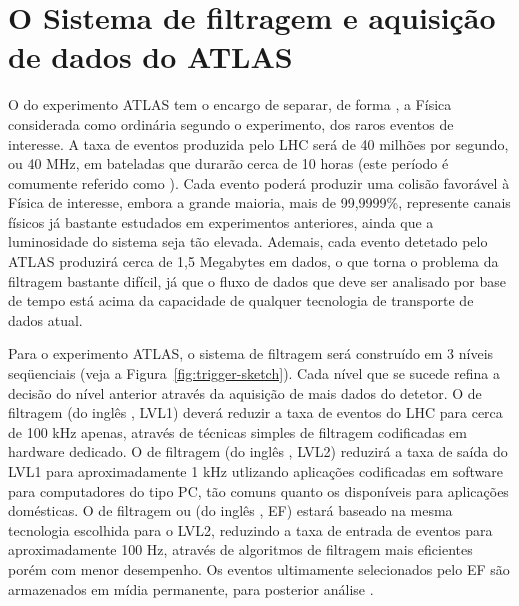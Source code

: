 \typeout{ ====================================================================}
\typeout{ ====================================================================}

\chapter{O Sistema de filtragem e aquisição de dados do ATLAS}
\label{chap:trigger}

O  do experimento ATLAS tem o encargo de separar, de
forma , a Física considerada como ordinária segundo o experimento,
dos raros eventos de interesse. A taxa de eventos produzida pelo LHC será de
40 milhões por segundo, ou 40 MHz, em bateladas que durarão cerca de 10 horas
(este período é comumente referido como ). Cada evento poderá
produzir uma colisão favorável à Física de interesse, embora a grande maioria,
mais de 99,9999\%, represente canais físicos já bastante estudados em
experimentos anteriores, ainda que a luminosidade do sistema seja tão
elevada. Ademais, cada evento detetado pelo ATLAS produzirá cerca de 1,5
Megabytes em dados, o que torna o problema da filtragem bastante difícil, já
que o fluxo de dados que deve ser analisado por base de tempo está acima da
capacidade de qualquer tecnologia de transporte de dados atual.

Para o experimento ATLAS, o sistema de filtragem será construído em 3 níveis
seqüenciais (veja a Figura~\ref{fig:trigger-sketch}). Cada nível que se sucede
refina a decisão do nível anterior através da aquisição de mais dados do
detetor. O  de filtragem (do inglês , LVL1) deverá reduzir a taxa de eventos do LHC para cerca de 100 kHz
apenas, através de técnicas simples de filtragem codificadas em hardware
dedicado. O  de filtragem (do inglês
, LVL2) reduzirá a taxa de saída do LVL1 para
aproximadamente 1 kHz utlizando aplicações codificadas em software para
computadores do tipo PC, tão comuns quanto os disponíveis para aplicações
domésticas. O  de filtragem ou
 (do inglês , EF) estará baseado
na mesma tecnologia escolhida para o LVL2, reduzindo a taxa de entrada de
eventos para aproximadamente 100 Hz, através de algoritmos de filtragem mais
eficientes porém com menor desempenho. Os eventos ultimamente selecionados
pelo EF são armazenados em mídia permanente, para posterior análise
. 

